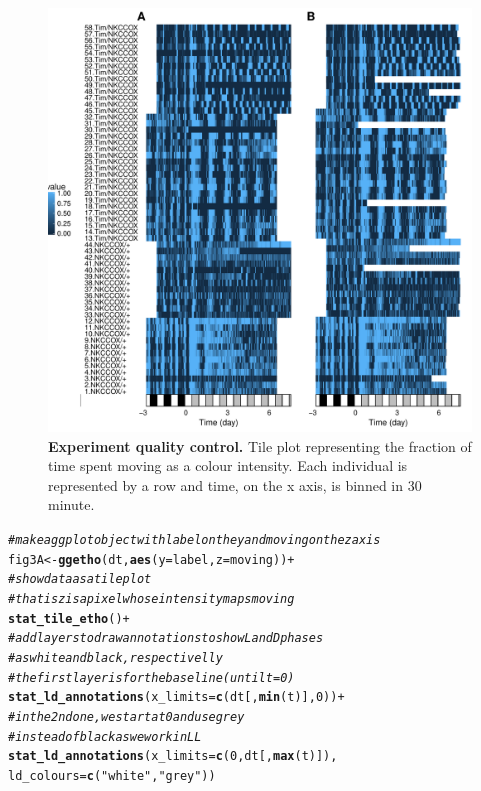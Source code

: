 \documentclass[10pt,letterpaper]{article}\usepackage[]{graphicx}\usepackage[]{color}
\makeatletter
\newcommand{\hlnum}[1]{\textcolor[rgb]{0.686,0.059,0.569}{#1}}%
\newcommand{\hlstr}[1]{\textcolor[rgb]{0.192,0.494,0.8}{#1}}%
\newcommand{\hlcom}[1]{\textcolor[rgb]{0.678,0.584,0.686}{\textit{#1}}}%
\newcommand{\hlopt}[1]{\textcolor[rgb]{0,0,0}{#1}}%
\newcommand{\hlstd}[1]{\textcolor[rgb]{0.345,0.345,0.345}{#1}}%
\newcommand{\hlkwb}[1]{\textcolor[rgb]{0.69,0.353,0.396}{#1}}%
\newcommand{\hlkwc}[1]{\textcolor[rgb]{0.333,0.667,0.333}{#1}}%
\newcommand{\hlkwd}[1]{\textcolor[rgb]{0.737,0.353,0.396}{\textbf{#1}}}%
\newenvironment{kframe}{%
 \def\at@end@of@kframe{}%
 \ifinner\ifhmode%
  \def\at@end@of@kframe{\end{minipage}}%
  \begin{minipage}{\columnwidth}%
 \fi\fi%
 \def\FrameCommand##1{\hskip\@totalleftmargin \hskip-\fboxsep
 \colorbox{shadecolor}{##1}\hskip-\fboxsep
     \hskip-\linewidth \hskip-\@totalleftmargin \hskip\columnwidth}%
 \MakeFramed {\advance\hsize-\width
   \@totalleftmargin\z@ \linewidth\hsize
   \@setminipage}}%
 {\par\unskip\endMakeFramed%
 \at@end@of@kframe}
\newenvironment{knitrout}{}{} %
\makeatother
\begin{document}
\begin{figure}[!h]
	\includegraphics[width=1\textwidth]{fig/fig-3.pdf}
	\caption{{\bf Experiment quality control.}
			Tile plot representing the fraction of time spent moving as a colour intensity.
			Each individual is represented by a row and time, on the x axis, is binned in 30 minute.}
	\label{fig:fig-3}
\end{figure}

\begin{knitrout}
\color{fgcolor}\begin{kframe}
\begin{alltt}
\hlcom{# make a ggplot object with label on the y and moving on the z axis}
\hlstd{fig3A} \hlkwb{<-} \hlkwd{ggetho}\hlstd{(dt,} \hlkwd{aes}\hlstd{(}\hlkwc{y} \hlstd{= label,} \hlkwc{z} \hlstd{= moving))} \hlopt{+}
  \hlcom{# show data as a tile plot}
  \hlcom{# that is z is a pixel whose intensity maps moving}
  \hlkwd{stat_tile_etho}\hlstd{()} \hlopt{+}
  \hlcom{# add layers to draw annotations to show L and D phases}
  \hlcom{# as white and black, respectivelly}
  \hlcom{# the first layer is for the baseline (until t = 0)}
  \hlkwd{stat_ld_annotations}\hlstd{(}\hlkwc{x_limits} \hlstd{=} \hlkwd{c}\hlstd{(dt[,}\hlkwd{min}\hlstd{(t)],} \hlnum{0}\hlstd{))} \hlopt{+}
  \hlcom{# in the 2nd one, we start at 0 and use grey }
  \hlcom{# instead of black as we work in LL}
  \hlkwd{stat_ld_annotations}\hlstd{(}\hlkwc{x_limits} \hlstd{=} \hlkwd{c}\hlstd{(}\hlnum{0}\hlstd{, dt[,} \hlkwd{max}\hlstd{(t)]),}
                      \hlkwc{ld_colours} \hlstd{=} \hlkwd{c}\hlstd{(}\hlstr{"white"}\hlstd{,} \hlstr{"grey"}\hlstd{))}
\end{alltt}
\end{kframe}
\end{knitrout}
\end{document}
